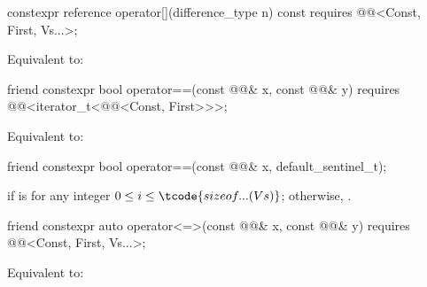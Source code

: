%
\begin{itemdecl}
constexpr reference operator[](difference_type n) const
  requires @@<Const, First, Vs...>;
\end{itemdecl}

\begin{itemdescr}
\pnum
\effects
Equivalent to: 
\end{itemdescr}

%
\begin{itemdecl}
friend constexpr bool operator==(const @@& x, const @@& y)
  requires @@<iterator_t<@@<Const, First>>>;
\end{itemdecl}

\begin{itemdescr}
\pnum
\effects
Equivalent to: 
\end{itemdescr}

%
\begin{itemdecl}
friend constexpr bool operator==(const @@& x, default_sentinel_t);
\end{itemdecl}

\begin{itemdescr}
\pnum
\returns
{} if 
is 
for any integer $0 \le i \le \tcode{sizeof...(Vs)}$;
otherwise, .
\end{itemdescr}

%
\begin{itemdecl}
friend constexpr auto operator<=>(const @@& x, const @@& y)
  requires @@<Const, First, Vs...>;
\end{itemdecl}

\begin{itemdescr}
\pnum
\effects
Equivalent to: 
\end{itemdescr}

